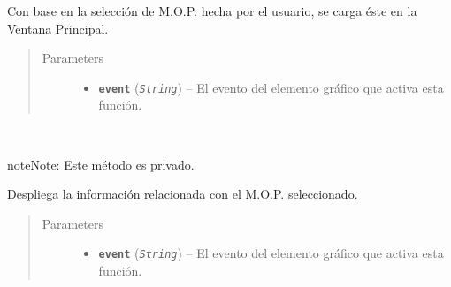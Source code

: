 \documentclass[class=report, crop=false]{standalone}
\begin{document}
\begin{fulllineitems}
\begin{fulllineitems}
Con base en la selección de M.O.P.
hecha por el usuario, se carga éste
en la Ventana Principal.

\begin{quote}\begin{description}
\item[{Parameters}] \leavevmode\begin{itemize}
\item\textbf{\texttt{event}} (\emph{\texttt{String}}) -- El evento del elemento gráfico que
activa esta función.
\end{itemize}
\end{description}\end{quote}

\end{fulllineitems}

\begin{fulllineitems}

~

\begin{notice}{note}{Note:}
Este método es privado.
\end{notice}

Despliega la información relacionada con el
M.O.P. seleccionado.

\begin{quote}\begin{description}
\item[{Parameters}] \leavevmode\begin{itemize}
\item \textbf{\texttt{event}} (\emph{\texttt{String}}) -- El evento del elemento gráfico que
activa esta función.
\end{itemize}
\end{description}\end{quote}

\end{fulllineitems}

\end{fulllineitems}
\end{document}

